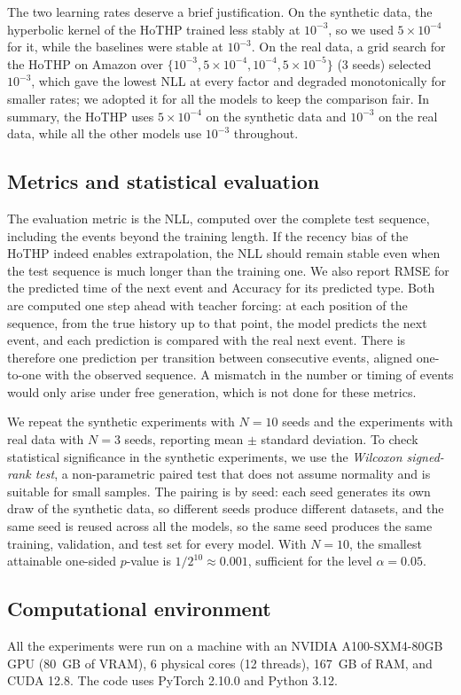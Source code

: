 The two learning rates deserve a brief justification. On the synthetic data, the hyperbolic kernel of the HoTHP trained less stably at $10^{-3}$, so we used $5 \times 10^{-4}$ for it, while the baselines were stable at $10^{-3}$. On the real data, a grid search for the HoTHP on Amazon over $\{10^{-3}, 5 \times 10^{-4}, 10^{-4}, 5 \times 10^{-5}\}$ (3 seeds) selected $10^{-3}$, which gave the lowest NLL at every factor and degraded monotonically for smaller rates; we adopted it for all the models to keep the comparison fair. In summary, the HoTHP uses $5 \times 10^{-4}$ on the synthetic data and $10^{-3}$ on the real data, while all the other models use $10^{-3}$ throughout.

\subsection{Metrics and statistical evaluation}
\label{subsec:metricas}

The evaluation metric is the \gls{NLL}, computed over the complete test sequence, including the events beyond the training length. If the recency bias of the HoTHP indeed enables extrapolation, the NLL should remain stable even when the test sequence is much longer than the training one. We also report RMSE for the predicted time of the next event and Accuracy for its predicted type. Both are computed one step ahead with teacher forcing: at each position of the sequence, from the true history up to that point, the model predicts the next event, and each prediction is compared with the real next event. There is therefore one prediction per transition between consecutive events, aligned one-to-one with the observed sequence. A mismatch in the number or timing of events would only arise under free generation, which is not done for these metrics.

We repeat the synthetic experiments with $N = 10$ seeds and the experiments with real data with $N = 3$ seeds, reporting mean $\pm$ standard deviation. To check statistical significance in the synthetic experiments, we use the \textit{Wilcoxon signed-rank test}, a non-parametric paired test that does not assume normality and is suitable for small samples. The pairing is by seed: each seed generates its own draw of the synthetic data, so different seeds produce different datasets, and the same seed is reused across all the models, so the same seed produces the same training, validation, and test set for every model. With $N = 10$, the smallest attainable one-sided $p$-value is $1/2^{10} \approx 0.001$, sufficient for the level $\alpha = 0.05$.

\subsection{Computational environment}
\label{subsec:ambiente-computacional}

All the experiments were run on a machine with an NVIDIA A100-SXM4-80GB GPU (80~GB of VRAM), 6 physical cores (12 threads), 167~GB of RAM, and CUDA 12.8. The code uses PyTorch 2.10.0 and Python 3.12.

